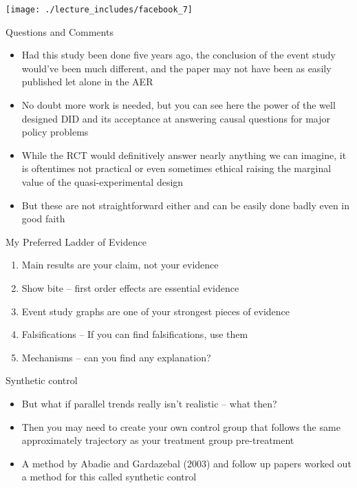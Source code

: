 \documentclass{beamer}
\begin{document}
\begin{frame}
\begin{center}
\texttt{[image: ./lecture\_includes/facebook\_7]}
\end{center}
\end{frame}

\begin{frame}{Questions and Comments}

\begin{itemize}
\item Had this study been done five years ago, the conclusion of the event study would've been much different, and the paper may not have been as easily published let alone in the AER
\item No doubt more work is needed, but you can see here the power of the well designed DID and its acceptance at answering causal questions for major policy problems 
\item While the RCT would definitively answer nearly anything we can imagine, it is oftentimes not practical or even sometimes ethical raising the marginal value of the quasi-experimental design
\item But these are not straightforward either and can be easily done badly even in good faith

\end{itemize}

\end{frame}





\begin{frame}{My Preferred Ladder of Evidence}

\begin{enumerate}
\item Main results are your claim, not your evidence
\item Show bite -- first order effects are essential evidence
\item Event study graphs are one of your strongest pieces of evidence
\item Falsifications -- If you can find falsifications, use them
\item Mechanisms -- can you find any explanation?
\end{enumerate}

\end{frame}

\begin{frame}{Synthetic control}

\begin{itemize}

\item But what if parallel trends really isn't realistic -- what then?
\item Then you may need to create your own control group that follows the same approximately trajectory as your treatment group pre-treatment
\item A method by Abadie and Gardazebal (2003) and follow up papers worked out a method for this called synthetic control

\end{itemize}

\end{frame}
\end{document}
